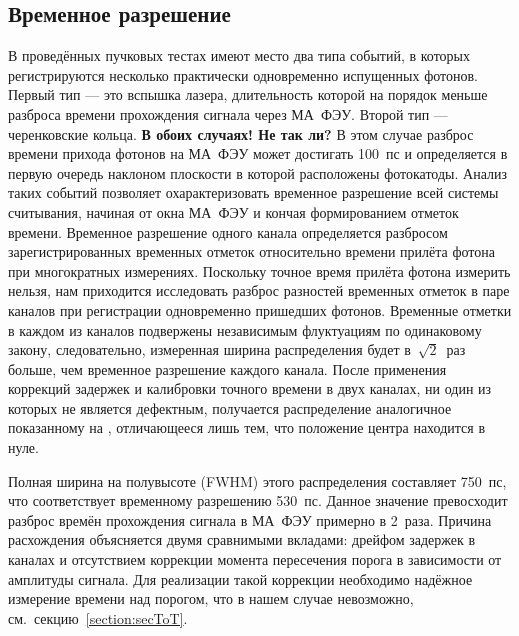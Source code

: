 \subsection{Временное разрешение}\label{section:TimeRes}

В проведённых пучковых тестах имеют место два типа событий, в которых регистрируются несколько практически одновременно испущенных фотонов. Первый тип --- это вспышка лазера, длительность которой на порядок меньше разброса времени прохождения сигнала через МА~ФЭУ. Второй тип --- черенковские кольца.
\textbf{В обоих случаях! Не так ли?}
В этом случае разброс времени прихода фотонов на МА~ФЭУ может достигать 100~пс и определяется в первую очередь наклоном плоскости в которой расположены фотокатоды. Анализ таких событий позволяет охарактеризовать временное разрешение всей системы считывания, начиная от окна МА~ФЭУ и кончая формированием отметок времени. Временное разрешение одного канала определяется разбросом зарегистрированных временных отметок относительно времени прилёта фотона при многократных измерениях. Поскольку точное время прилёта фотона измерить нельзя, нам приходится исследовать разброс разностей временных отметок в паре каналов при регистрации одновременно пришедших фотонов. Временные отметки в каждом из каналов подвержены независимым флуктуациям по одинаковому закону, следовательно, измеренная ширина распределения будет в~$\sqrt 2$~раз больше, чем временное разрешение каждого канала.
После применения коррекций задержек и калибровки точного времени в двух каналах, ни один из которых не является дефектным, получается распределение аналогичное показанному на , отличающееся лишь тем, что положение центра находится в нуле.


Полная ширина на полувысоте (FWHM) этого распределения составляет 750~пс, что соответствует временному разрешению 530~пс. Данное значение превосходит разброс времён прохождения сигнала в МА~ФЭУ примерно в 2~раза. Причина расхождения объясняется двумя сравнимыми вкладами: дрейфом задержек в каналах и отсутствием коррекции момента пересечения порога в зависимости от амплитуды сигнала. Для реализации такой коррекции необходимо надёжное измерение времени над порогом, что в нашем случае невозможно, см.~секцию~\ref{section:secToT}.

